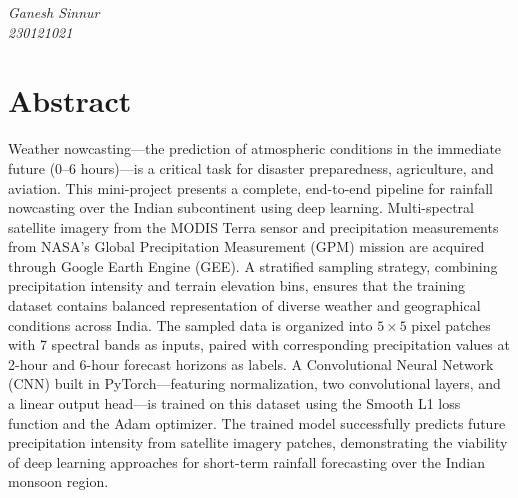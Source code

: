 \documentclass[12pt, a4paper]{report}
\begin{document}
\vspace{2cm}

\begin{flushright}
\textit{Ganesh Sinnur\\
230121021}
\end{flushright}

\clearpage

\chapter*{Abstract}

Weather nowcasting---the prediction of atmospheric conditions in the immediate future (0--6 hours)---is a critical task for disaster preparedness, agriculture, and aviation. This mini-project presents a complete, end-to-end pipeline for rainfall nowcasting over the Indian subcontinent using deep learning. Multi-spectral satellite imagery from the MODIS Terra sensor and precipitation measurements from NASA's Global Precipitation Measurement (GPM) mission are acquired through Google Earth Engine (GEE). A stratified sampling strategy, combining precipitation intensity and terrain elevation bins, ensures that the training dataset contains balanced representation of diverse weather and geographical conditions across India. The sampled data is organized into $5\times5$ pixel patches with 7 spectral bands as inputs, paired with corresponding precipitation values at 2-hour and 6-hour forecast horizons as labels. A Convolutional Neural Network (CNN) built in PyTorch---featuring normalization, two convolutional layers, and a linear output head---is trained on this dataset using the Smooth L1 loss function and the Adam optimizer. The trained model successfully predicts future precipitation intensity from satellite imagery patches, demonstrating the viability of deep learning approaches for short-term rainfall forecasting over the Indian monsoon region.

\clearpage

\tableofcontents
\clearpage



\end{document}

